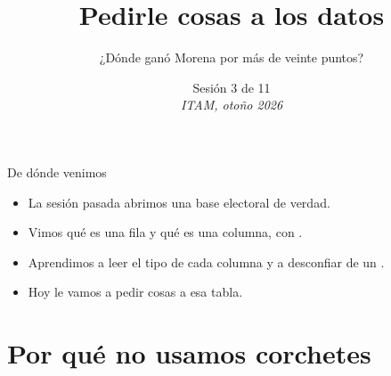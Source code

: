 %



\title[Lab de R · Sesión 3]{Pedirle cosas a los datos}
\subtitle{¿Dónde ganó Morena por más de veinte puntos?}
\date{%
  Sesión 3 de 11\\[0.3em]
  \textit{ITAM, otoño 2026}%
}



{
\begin{frame}
  \titlepage
\end{frame}}


\begin{frame}{De dónde venimos}
  \vspace{0.3em}
  \begin{itemize}\setlength{\itemsep}{0.9em}
    \item<1-> La sesión pasada abrimos una base electoral de verdad.
    \item<2-> Vimos qué es una fila y qué es una columna, con .
    \item<3-> Aprendimos a leer el tipo de cada columna y a desconfiar de un .
    \item<4-> Hoy le vamos a \ac{pedir cosas} a esa tabla.
  \end{itemize}
\end{frame}

\section{Por qué no usamos corchetes}

